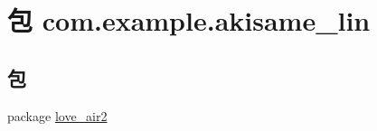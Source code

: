 \hypertarget{namespacecom_1_1example_1_1akisame__lin}{}\section{包 com.\+example.\+akisame\+\_\+lin}
\label{namespacecom_1_1example_1_1akisame__lin}
\subsection*{包}
\begin{DoxyCompactItemize}
\item 
package \mbox{\hyperlink{namespacecom_1_1example_1_1akisame__lin_1_1love__air2}{love\+\_\+air2}}
\end{DoxyCompactItemize}
